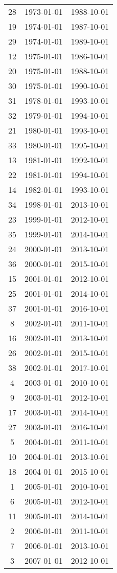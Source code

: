 % 
\begin{tabular}{ccc}
  \hline
  \hline
28 & 1973-01-01 & 1988-10-01 \\ 
  19 & 1974-01-01 & 1987-10-01 \\ 
  29 & 1974-01-01 & 1989-10-01 \\ 
  12 & 1975-01-01 & 1986-10-01 \\ 
  20 & 1975-01-01 & 1988-10-01 \\ 
  30 & 1975-01-01 & 1990-10-01 \\ 
  31 & 1978-01-01 & 1993-10-01 \\ 
  32 & 1979-01-01 & 1994-10-01 \\ 
  21 & 1980-01-01 & 1993-10-01 \\ 
  33 & 1980-01-01 & 1995-10-01 \\ 
  13 & 1981-01-01 & 1992-10-01 \\ 
  22 & 1981-01-01 & 1994-10-01 \\ 
  14 & 1982-01-01 & 1993-10-01 \\ 
  34 & 1998-01-01 & 2013-10-01 \\ 
  23 & 1999-01-01 & 2012-10-01 \\ 
  35 & 1999-01-01 & 2014-10-01 \\ 
  24 & 2000-01-01 & 2013-10-01 \\ 
  36 & 2000-01-01 & 2015-10-01 \\ 
  15 & 2001-01-01 & 2012-10-01 \\ 
  25 & 2001-01-01 & 2014-10-01 \\ 
  37 & 2001-01-01 & 2016-10-01 \\ 
  8 & 2002-01-01 & 2011-10-01 \\ 
  16 & 2002-01-01 & 2013-10-01 \\ 
  26 & 2002-01-01 & 2015-10-01 \\ 
  38 & 2002-01-01 & 2017-10-01 \\ 
  4 & 2003-01-01 & 2010-10-01 \\ 
  9 & 2003-01-01 & 2012-10-01 \\ 
  17 & 2003-01-01 & 2014-10-01 \\ 
  27 & 2003-01-01 & 2016-10-01 \\ 
  5 & 2004-01-01 & 2011-10-01 \\ 
  10 & 2004-01-01 & 2013-10-01 \\ 
  18 & 2004-01-01 & 2015-10-01 \\ 
  1 & 2005-01-01 & 2010-10-01 \\ 
  6 & 2005-01-01 & 2012-10-01 \\ 
  11 & 2005-01-01 & 2014-10-01 \\ 
  2 & 2006-01-01 & 2011-10-01 \\ 
  7 & 2006-01-01 & 2013-10-01 \\ 
  3 & 2007-01-01 & 2012-10-01 \\ 
   \hline
\end{tabular}
